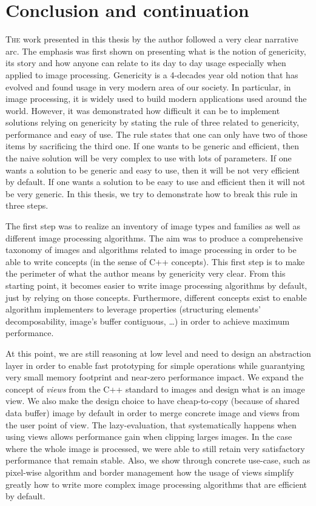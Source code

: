 \chapter{Conclusion and continuation}
\label{chap:conclusion}

\lettrine[lines=2]{T}{he} work presented in this thesis by the author followed a very clear narrative arc. The emphasis
was first shown on presenting what is the notion of genericity, its story and how anyone can relate to its day to day
usage especially when applied to image processing. Genericity is a 4-decades year old notion that has evolved and found
usage in very modern area of our society. In particular, in image processing, it is widely used to build modern
applications used around the world. However, it was demonstrated how difficult it can be to implement solutions relying
on genericity by stating the rule of three related to genericity, performance and easy of use. The rule states that one
can only have two of those items by sacrificing the third one. If one wants to be generic and efficient, then the naive
solution will be very complex to use with lots of parameters. If one wants a solution to be generic and easy to use,
then it will be not very efficient by default. If one wants a solution to be easy to use and efficient then it will not
be very generic. In this thesis, we try to demonstrate how to break this rule in three steps.

The first step was to realize an inventory of image types and families as well as different image processing algorithms.
The aim was to produce a comprehensive taxonomy of images and algorithms related to image processing in order to be able
to write concepts (in the sense of C++ concepts). This first step is to make the perimeter of what the author means by
genericity very clear. From this starting point, it becomes easier to write image processing algorithms by default, just
by relying on those concepts. Furthermore, different concepts exist to enable algorithm implementers to leverage
properties (structuring elements' decomposability, image's buffer contiguous, \ldots) in order to achieve maximum
performance.

At this point, we are still reasoning at low level and need to design an abstraction layer in order to enable fast
prototyping for simple operations while guarantying very small memory footprint and near-zero performance impact. We
expand the concept of \emph{views} from the C++ standard to images and design what is an image view. We also make the
design choice to have cheap-to-copy (because of shared data buffer) image by default in order to merge concrete image
and views from the user point of view. The lazy-evaluation, that systematically happens when using views allows
performance gain when clipping larges images. In the case where the whole image is processed, we were able to still
retain very satisfactory performance that remain stable. Also, we show through concrete use-case, such as pixel-wise
algorithm and border management how the usage of views simplify greatly how to write more complex image processing
algorithms that are efficient by default.

